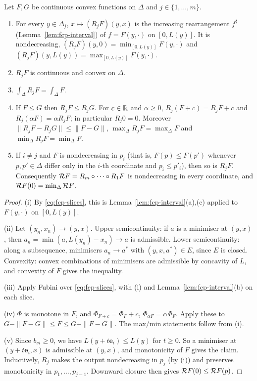 \begin{lemma}[Properties of $R_j$]\label{lem:fcp-rearrangement}
Let $F,G$ be continuous convex functions on $\Delta$ and $j\in\{1,\dots,m\}$.
\begin{enumerate}[label=(\roman*)]
\item For every $y\in\Delta_j$, $x\mapsto(R_jF)(y,x)$ is the increasing rearrangement $f^\sharp$ (Lemma~\ref{lem:fcp-interval}) of
 $f=F(y,\cdot)$ on $[0,L(y)]$. It is nondecreasing,
 $(R_jF)(y,0)=\min_{[0,L(y)]}F(y,\cdot)$ and $(R_jF)(y,L(y))=\max_{[0,L(y)]}F(y,\cdot)$.
\item $R_jF$ is continuous and convex on $\Delta$.
\item $\int_\Delta R_jF=\int_\Delta F$.
\item If $F\le G$ then $R_jF\le R_jG$. For $c\in\mathbb{R}$ and $\alpha\ge0$, $R_j(F+c)=R_jF+c$ and
 $R_j(\alpha F)=\alpha R_jF$; in particular $R_j0=0$. Moreover $\|R_jF-R_jG\|\le\|F-G\|$,
 $\max_\Delta R_jF=\max_\Delta F$ and $\min_\Delta R_jF=\min_\Delta F$.
\item If $i\ne j$ and $F$ is nondecreasing in $p_i$ (that is, $F(p)\le F(p')$ whenever $p,p'\in\Delta$ differ only in
 the $i$-th coordinate and $p_i\le p'_i$), then so is $R_jF$. Consequently $\mathcal{R} F=R_m\circ\dots\circ R_1F$ is
 nondecreasing in every coordinate, and $\mathcal{R} F(0)=\min_\Delta\mathcal{R} F$.
\end{enumerate}
\end{lemma}

\begin{proof}
(i) By \eqref{eq:fcp-slices}, this is Lemma~\ref{lem:fcp-interval}(a),(c) applied to $F(y,\cdot)$ on $[0,L(y)]$.

(ii) Let $(y_n,x_n)\to(y,x)$. Upper semicontinuity: if $a$ is a minimiser at $(y,x)$, then $a_n=\min(a,L(y_n)-x_n)\to a$ is admissible. Lower semicontinuity: along a subsequence, minimisers $a_n\to a^*$ with $(y,x,a^*)\in E$, since $E$ is closed. Convexity: convex combinations of minimisers are admissible by concavity of $L$, and convexity of $F$ gives the inequality.

(iii) Apply Fubini over \eqref{eq:fcp-slices}, with (i) and Lemma~\ref{lem:fcp-interval}(b) on each slice.

(iv) $\Phi$ is monotone in $F$, and $\Phi_{F+c}=\Phi_F+c$, $\Phi_{\alpha F}=\alpha\Phi_F$. Apply these to $G-\|F-G\|\le F\le G+\|F-G\|$. The max/min statements follow from (i).

(v) Since $b_{\nu i}\ge0$, we have $L(y+t\mathbf e_i)\le L(y)$ for $t\ge0$. So a minimiser at $(y+t\mathbf e_i,x)$ is admissible at $(y,x)$, and monotonicity of $F$ gives the claim. Inductively, $R_j$ makes the output nondecreasing in $p_j$ (by (i)) and preserves monotonicity in $p_1,\dots,p_{j-1}$. Downward closure then gives $\mathcal{R} F(0)\le\mathcal{R} F(p)$.
\end{proof}

